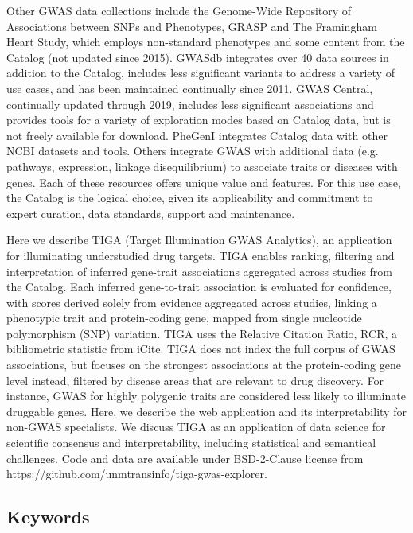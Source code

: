 Other GWAS data collections include the Genome-Wide Repository of Associations between SNPs and Phenotypes, GRASP\cite{Eicher2015-ph} and The Framingham Heart Study, which employs non-standard phenotypes and some content from the Catalog (not updated since 2015). GWASdb\cite{Li2016-fo} integrates over 40 data sources in addition to the Catalog, includes less significant variants to address a variety of use cases, and has been maintained continually since 2011. GWAS Central, continually updated through 2019, includes less significant associations and provides tools for a variety of exploration modes based on Catalog data, but is not freely available for download. PheGenI\cite{Ramos2014-zq} integrates Catalog data with other NCBI datasets and tools. Others integrate GWAS with additional data (e.g. pathways, expression, linkage disequilibrium) to associate traits or diseases with genes\cite{Palleja2012-mb,Greene2015-ix,Shen2017-tt,Li2018-vj,Wainberg2019-ry}. Each of these resources offers unique value and features. For this use case, the Catalog is the logical choice, given its applicability and commitment to expert curation, data standards, support and maintenance.

Here we describe TIGA (Target Illumination GWAS Analytics), an application for illuminating understudied drug targets. TIGA enables ranking, filtering and interpretation of inferred gene-trait associations aggregated across studies from the Catalog. Each inferred gene-to-trait association is evaluated for confidence, with scores derived solely from evidence aggregated across studies, linking a phenotypic trait and protein-coding gene, mapped from single nucleotide polymorphism (SNP) variation. TIGA uses the Relative Citation Ratio, RCR\cite{Hutchins2016-hs}, a bibliometric statistic from iCite\cite{Hutchins2019-ue}. TIGA does not index the full corpus of GWAS associations, but focuses on the strongest associations at the protein-coding gene level instead, filtered by disease areas that are relevant to drug discovery. For instance, GWAS for highly polygenic traits are considered less likely to illuminate druggable genes. Here, we describe the web application and its interpretability for non-GWAS specialists. We discuss TIGA as an application of data science for scientific consensus and interpretability, including statistical and semantical challenges. Code and data are available under BSD-2-Clause license from https://github.com/unmtransinfo/tiga-gwas-explorer.

\subsection{Keywords}

